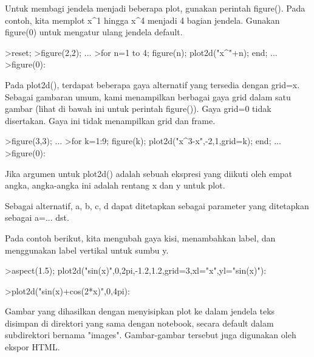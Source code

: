 \documentclass{article}
\begin{document}
\begin{eulernotebook}
\begin{eulercomment}
\begin{eulercomment}
\begin{eulercomment}
\begin{eulercomment}
\begin{eulercomment}
Untuk membagi jendela menjadi beberapa plot, gunakan perintah
figure(). Pada contoh, kita memplot x\textasciicircum{}1 hingga x\textasciicircum{}4 menjadi 4 bagian
jendela. Gunakan figure(0) untuk mengatur ulang jendela default.
\end{eulercomment}
\begin{eulerprompt}
>reset;
>figure(2,2); ...
>for n=1 to 4; figure(n); plot2d("x^"+n); end; ...
>figure(0):
\end{eulerprompt}
\begin{eulercomment}
Pada plot2d(), terdapat beberapa gaya alternatif yang tersedia dengan
grid=x. Sebagai gambaran umum, kami menampilkan berbagai gaya grid
dalam satu gambar (lihat di bawah ini untuk perintah figure()). Gaya
grid=0 tidak disertakan. Gaya ini tidak menampilkan grid dan frame.
\end{eulercomment}
\begin{eulerprompt}
>figure(3,3); ...
>for k=1:9; figure(k); plot2d("x^3-x",-2,1,grid=k); end; ...
>figure(0):
\end{eulerprompt}
\begin{eulercomment}
Jika argumen untuk plot2d() adalah sebuah ekspresi yang diikuti oleh
empat angka, angka-angka ini adalah rentang x dan y untuk plot.

Sebagai alternatif, a, b, c, d dapat ditetapkan sebagai parameter yang
ditetapkan sebagai a=... dst.

Pada contoh berikut, kita mengubah gaya kisi, menambahkan label, dan
menggunakan label vertikal untuk sumbu y.
\end{eulercomment}
\begin{eulerprompt}
>aspect(1.5); plot2d("sin(x)",0,2pi,-1.2,1.2,grid=3,xl="x",yl="sin(x)"):
\end{eulerprompt}
\begin{eulerprompt}
>plot2d("sin(x)+cos(2*x)",0,4pi):
\end{eulerprompt}
\begin{eulercomment}
Gambar yang dihasilkan dengan menyisipkan plot ke dalam jendela teks
disimpan di direktori yang sama dengan notebook, secara default dalam
subdirektori bernama "images". Gambar-gambar tersebut juga digunakan
oleh ekspor HTML.


\end{eulercomment}
\end{eulercomment}
\end{eulercomment}
\end{eulercomment}
\end{eulercomment}
\end{eulernotebook}
\end{document}
